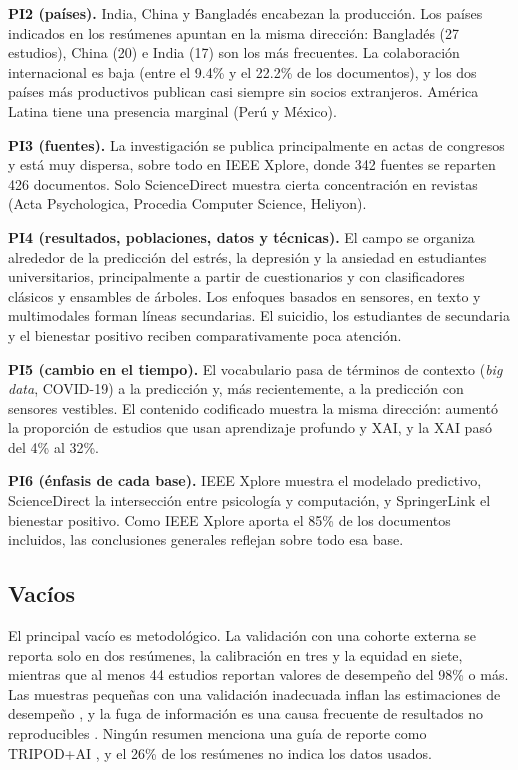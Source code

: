 \documentclass[11pt,a4paper]{article}
\begin{document}
\textbf{PI2 (países).} India, China y Bangladés encabezan la producción. Los países indicados en los resúmenes apuntan en la misma dirección: Bangladés (27 estudios), China (20) e India (17) son los más frecuentes. La colaboración internacional es baja (entre el 9.4\% y el 22.2\% de los documentos), y los dos países más productivos publican casi siempre sin socios extranjeros. América Latina tiene una presencia marginal (Perú y México).

\textbf{PI3 (fuentes).} La investigación se publica principalmente en actas de congresos y está muy dispersa, sobre todo en IEEE Xplore, donde 342 fuentes se reparten 426 documentos. Solo ScienceDirect muestra cierta concentración en revistas (Acta Psychologica, Procedia Computer Science, Heliyon).

\textbf{PI4 (resultados, poblaciones, datos y técnicas).} El campo se organiza alrededor de la predicción del estrés, la depresión y la ansiedad en estudiantes universitarios, principalmente a partir de cuestionarios y con clasificadores clásicos y ensambles de árboles. Los enfoques basados en sensores, en texto y multimodales forman líneas secundarias. El suicidio, los estudiantes de secundaria y el bienestar positivo reciben comparativamente poca atención.

\textbf{PI5 (cambio en el tiempo).} El vocabulario pasa de términos de contexto (\emph{big data}, COVID-19) a la predicción y, más recientemente, a la predicción con sensores vestibles. El contenido codificado muestra la misma dirección: aumentó la proporción de estudios que usan aprendizaje profundo y XAI, y la XAI pasó del 4\% al 32\%.

\textbf{PI6 (énfasis de cada base).} IEEE Xplore muestra el modelado predictivo, ScienceDirect la intersección entre psicología y computación, y SpringerLink el bienestar positivo. Como IEEE Xplore aporta el 85\% de los documentos incluidos, las conclusiones generales reflejan sobre todo esa base.

\subsection{Vacíos}

El principal vacío es metodológico. La validación con una cohorte externa se reporta solo en dos resúmenes, la calibración en tres y la equidad en siete, mientras que al menos 44 estudios reportan valores de desempeño del 98\% o más. Las muestras pequeñas con una validación inadecuada inflan las estimaciones de desempeño \cite{vabalas2019validation}, y la fuga de información es una causa frecuente de resultados no reproducibles \cite{kapoor2023leakage}. Ningún resumen menciona una guía de reporte como TRIPOD+AI \cite{collins2024tripodai}, y el 26\% de los resúmenes no indica los datos usados.
\end{document}
